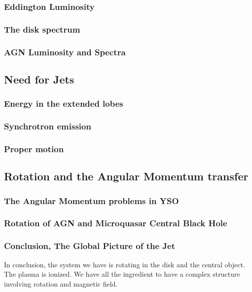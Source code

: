 \documentclass[10pt,a4paper,english]{article}
\begin{document}
\subsubsection{Eddington Luminosity}
\subsubsection{The disk spectrum}
\subsubsection{AGN Luminosity and Spectra}

\subsection{Need for Jets}
\subsubsection{Energy in the extended lobes}
\subsubsection{Synchrotron emission}
\subsubsection{Proper motion}

\subsection{Rotation and the Angular Momentum transfer}
\subsubsection{The Angular Momentum problems in YSO}
\subsubsection{Rotation of AGN and Microquasar Central Black Hole}
\subsubsection{Conclusion, The Global Picture of the Jet}

In conclusion, the system we have is rotating in the disk and the central object. The plasma is ionized. We have all the ingredient to have a complex structure involving rotation and magnetic field.
\end{document}
